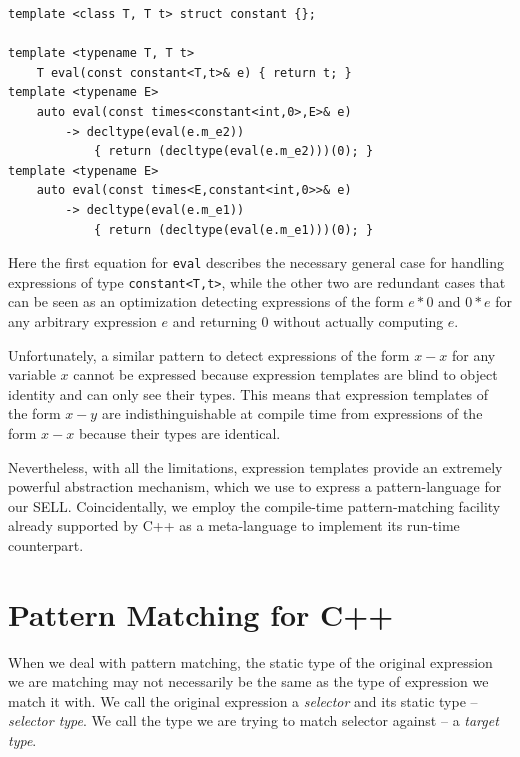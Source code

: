 \documentclass[preprint]{sigplanconf}
\makeatletter
\DeclareRobustCommand{\code}[1]{{\lstinline[breaklines=false,escapechar=@]{#1}}}
\makeatother
\begin{document}
\begin{lstlisting}[keepspaces,columns=flexible]
template <class T, T t> struct constant {};

template <typename T, T t>
    T eval(const constant<T,t>& e) { return t; }
template <typename E>
    auto eval(const times<constant<int,0>,E>& e) 
        -> decltype(eval(e.m_e2)) 
            { return (decltype(eval(e.m_e2)))(0); }
template <typename E>
    auto eval(const times<E,constant<int,0>>& e) 
        -> decltype(eval(e.m_e1)) 
            { return (decltype(eval(e.m_e1)))(0); }
\end{lstlisting}

\noindent Here the first equation for \code{eval} describes the necessary general 
case for handling expressions of type \code{constant<T,t>}, while the other two 
are redundant cases that can be seen as an optimization detecting expressions of 
the form $e*0$ and $0*e$ for any arbitrary expression $e$ and returning 0 
without actually computing $e$.

Unfortunately, a similar pattern to detect expressions of the form $x-x$ for any 
variable $x$ cannot be expressed because expression templates are blind to 
object identity and can only see their types. This means that expression 
templates of the form $x-y$ are indisthinguishable at compile time from 
expressions of the form $x-x$ because their types are identical.

Nevertheless, with all the limitations, expression templates provide an 
extremely powerful abstraction mechanism, which we use to express a 
pattern-language for our SELL. Coincidentally, we employ the compile-time 
pattern-matching facility already supported by C++ as a meta-language to 
implement its run-time counterpart.

\section{Pattern Matching for C++} %
\label{sec:pm}


When we deal with pattern matching, the static type of the original expression 
we are matching may not necessarily be the same as the type of expression we 
match it with. We call the original expression a \emph{selector} and its static 
type -- \emph{selector type}. We call the type we are trying to match selector 
against -- a \emph{target type}.
\end{document}
